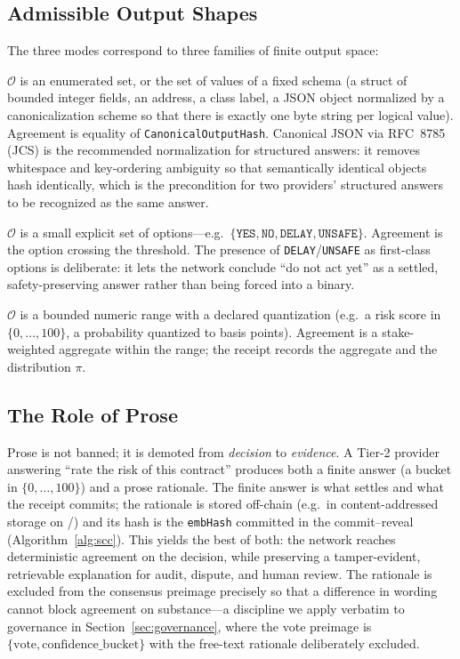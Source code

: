 \subsection{Admissible Output Shapes}

The three \SCC{} modes correspond to three families of finite output space:

\begin{description}[style=nextline,leftmargin=0pt]
\item[Categorical / structured (exact-hash mode).] $\mathcal{O}$ is an enumerated set, or the set of values of a fixed schema (a struct of bounded integer fields, an address, a class label, a JSON object normalized by a canonicalization scheme so that there is exactly one byte string per logical value). Agreement is equality of \texttt{CanonicalOutputHash}. Canonical JSON via RFC~8785 (JCS) \cite{rfc8785} is the recommended normalization for structured answers: it removes whitespace and key-ordering ambiguity so that semantically identical objects hash identically, which is the precondition for two providers' structured answers to be recognized as the same answer.
\item[Ballot (preference-metastability mode).] $\mathcal{O}$ is a small explicit set of options---e.g.\ $\{\texttt{YES},\texttt{NO},\texttt{DELAY},\texttt{UNSAFE}\}$. Agreement is the option crossing the threshold. The presence of \texttt{DELAY}/\texttt{UNSAFE} as first-class options is deliberate: it lets the network conclude ``do not act yet'' as a settled, safety-preserving answer rather than being forced into a binary.
\item[Bounded numeric (market-aggregation mode).] $\mathcal{O}$ is a bounded numeric range with a declared quantization (e.g.\ a risk score in $\{0,\dots,100\}$, a probability quantized to basis points). Agreement is a stake-weighted aggregate within the range; the receipt records the aggregate and the distribution $\pi$.
\end{description}

\subsection{The Role of Prose}

Prose is not banned; it is demoted from \emph{decision} to \emph{evidence}. A Tier-2 provider answering ``rate the risk of this contract'' produces both a finite answer (a bucket in $\{0,\dots,100\}$) and a prose rationale. The finite answer is what \SCC{} settles and what the \PoT{} receipt commits; the rationale is stored off-chain (e.g.\ in content-addressed storage on \MChain{}/\DChain{}) and its hash is the \texttt{embHash} committed in the commit--reveal (Algorithm~\ref{alg:scc}). This yields the best of both: the network reaches deterministic agreement on the decision, while preserving a tamper-evident, retrievable explanation for audit, dispute, and human review. The rationale is excluded from the consensus preimage precisely so that a difference in wording cannot block agreement on substance---a discipline we apply verbatim to governance in Section~\ref{sec:governance}, where the vote preimage is $\{\text{vote}, \text{confidence\_bucket}\}$ with the free-text rationale deliberately excluded.


